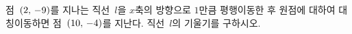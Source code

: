 점~$(2,\mkern3mu -9)$를 지나는 직선~$l$을 $x$축의 방향으로 $1$만큼 평행이동한 후 원점에 대하여 대칭이동하면 점~$(10,\mkern3mu -4)$를 지난다. 직선~$l$의 기울기를 구하시오.

